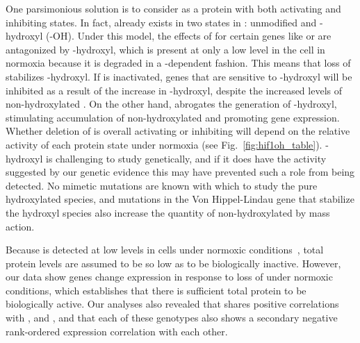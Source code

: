 One parsimonious solution is to consider \hifp{} as a protein with both
activating and inhibiting states. In fact, \hifp{} already exists in two states
in \cel{}: unmodified \hifp{} and \hifp{}-hydroxyl (\hifp{}-OH). Under this
model, the effects of \hifp{} for certain genes like \ftna{} or \nlp{} are
antagonized by \hifp{}-hydroxyl, which is present at only a low level in the
cell in normoxia because it is degraded in a -dependent fashion.
This means that loss of  stabilizes \hifp{}-hydroxyl. If 
is inactivated, genes that are
sensitive to \hifp{}-hydroxyl will be inhibited as a result of the increase in
\hifp{}-hydroxyl, despite the increased levels of
non-hydroxylated \hifp{}. On the other hand, \egl{}
abrogates the generation of \hifp{}-hydroxyl, stimulating accumulation of
non-hydroxylated \hifp{} and promoting gene expression. Whether deletion of \hif{}
is overall activating or inhibiting will depend on the relative activity of each
protein state under normoxia (see Fig.~\ref{fig:hif1oh_table}). \hifp{}-hydroxyl
is challenging to study genetically, and if it does have the activity suggested
by our genetic evidence this may have prevented such a role from being detected.
No mimetic mutations are known with which to study the pure
hydroxylated \hifp{} species, and mutations in the Von Hippel-Lindau gene that
stabilize the hydroxyl species also increase the quantity of non-hydroxylated
\hifp{} by mass action.

Because \hifp{} is detected at low levels in cells under normoxic
conditions~\citep{Wang1993}, total \hifp{} protein levels are assumed to be so
low as to be biologically inactive. However, our data show \hifn{} genes change
expression in response to loss of  under normoxic conditions, which
establishes that there is sufficient total \hifp{} protein to be biologically
active. Our analyses also revealed that \hif{} shares positive correlations with
\egl{}, \rhy{} and \vhl{}, and that each of these genotypes also shows a
secondary negative rank-ordered expression correlation with each other.


